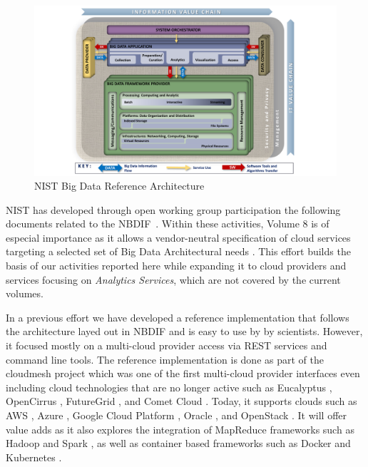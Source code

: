 \begin{figure}[htb]
\centering

\includegraphics[width=1.0\columnwidth]{images/NIST_RA_latest.pdf}

\caption{NIST Big Data Reference Architecture \cite{nist-v8}}

\label{fig:bdra}
\end{figure}

NIST has developed through open working group participation the
following documents related to the
NBDIF~\cite{nist-v1,nist-v2,nist-v3,nist-v4,nist-v5,nist-v6,nist-v7,nist-v8,nist-v9}. Within
these activities, Volume 8 is of especial importance as it allows a
vendor-neutral specification of cloud services targeting a selected
set of Big Data Architectural needs
\cite{cloudmesh-rest,cloudmesh-book}. This effort builds the basis of
our activities reported here while expanding it to cloud providers and
services focusing on {\em Analytics Services}, which are not covered
by the current volumes. 

In a previous effort we have developed a reference implementation that follows the architecture layed out in NBDIF and is easy to use by by scientists. 
However, it focused mostly on a multi-cloud provider access via REST services and command line tools. The reference implementation is done as part of the cloudmesh project which was one of the first multi-cloud provider interfaces even including cloud technologies that are no longer active such as Eucalyptus \cite{??}, OpenCirrus \cite{??}, FutureGrid \cite{??}, and Comet Cloud \cite{??}. Today, it supports clouds such as AWS \cite{www-aws}, Azure \cite{www-azure}, Google Cloud Platform \cite{??}, Oracle \cite{??}, and OpenStack \cite{www-openStack}. It will offer value adds as it also explores the integration of MapReduce frameworks such as Hadoop \cite{??} and Spark \cite{??}, as well as container based frameworks such as Docker \cite{??} and Kubernetes \cite{??}. 

